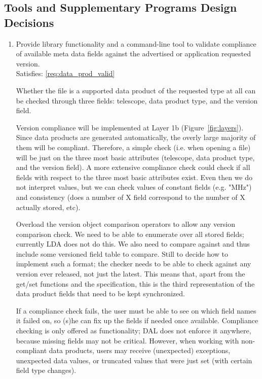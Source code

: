 \documentclass[a4paper,11pt]{article}
\begin{document}
\subsection{Tools and Supplementary Programs Design Decisions} \label{sec:tools_and_suppl_progs_design_decisions}

\begin{enumerate}[resume, label=\it D.\arabic{*}]
\itemsep0em

\item \label{dsg:data_prod_valid} Provide library functionality and a command-line tool to validate compliance of available meta data fields against the advertised or application requested version.\\
Satisfies: \ref{req:data_prod_valid}

Whether the file is a supported data product of the requested type at all can be checked through three fields: telescope, data product type, and the version field.

Version compliance will be implemented at Layer 1b (Figure~\ref{fig:layers}).
Since data products are generated automatically, the overly large majority of them will be compliant.
Therefore, a simple check (i.e. when opening a file) will be just on the three most basic attributes (telescope, data product type, and the version field).
A more extensive compliance check could check if all fields with respect to the three most basic attributes exist.
Even then we do not interpret values, but we can check values of constant fields (e.g. "MHz") and consistency (does a number of X field correspond to the number of X actually stored, etc).

Overload the version object comparison operators to allow any version comparison check.
We need to be able to enumerate over all stored fields; currently LDA does not do this.
We also need to compare against and thus include some versioned field table to compare.
Still to decide how to implement such a format; the checker needs to be able to check against any version ever released, not just the latest.
This means that, apart from the get/set functions and the specification, this is the third representation of the data product fields that need to be kept synchronized.

If a compliance check fails, the user must be able to see on which field names it failed on, so (s)he can fix up the fields if needed once available.
Compliance checking is only offered as functionality; DAL does not enforce it anywhere, because missing fields may not be critical.
However, when working with non-compliant data products, users may receive (unexpected) exceptions, unexpected data values, or truncated values that were just set (with certain field type changes).


\end{enumerate}
\end{document}
